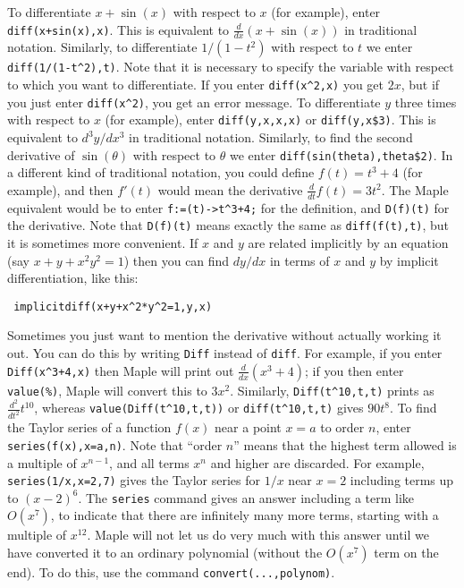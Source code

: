 \documentclass{amsart}
\begin{document}
\begin{itemize}
%
  To differentiate $x+\sin(x)$ with respect to $x$ (for
  example), enter \verb~diff(x+sin(x),x)~.  This is
  equivalent to $\frac{d}{dx}(x+\sin(x))$ in traditional
  notation.  Similarly, to differentiate $1/(1-t^2)$ with
  respect to $t$ we enter \verb~diff(1/(1-t^2),t)~.  
%
  Note that it is necessary to specify the
  variable with respect to which you want to differentiate. 
  If you enter \verb~diff(x^2,x)~ you get $2x$, but if you
  just enter \verb~diff(x^2)~, you get an error message. 
%
  To differentiate $y$ three times with respect to $x$
  (for example), enter \verb~diff(y,x,x,x)~ or
  \verb~diff(y,x$3)~.  This is equivalent to $d^3y/dx^3$ in
  traditional notation.  Similarly, to find the second
  derivative of $\sin(\theta)$ with respect to $\theta$ we
  enter \verb~diff(sin(theta),theta$2)~. 
%
  In a different kind of traditional notation, you
  could define $f(t)=t^3+4$ (for example), and then $f'(t)$
  would mean the derivative $\frac{d}{dt}f(t)=3t^2$.  The
  Maple equivalent would be to enter \verb~f:=(t)->t^3+4;~
  for the definition, and \verb~D(f)(t)~ for the derivative. 
  Note that \verb~D(f)(t)~ means exactly the same as
  \verb~diff(f(t),t)~, but it is sometimes more convenient. 
%
  If $x$ and $y$ are related implicitly
  by an equation (say $x+y+x^2y^2=1$) then you can find
  $dy/dx$ in terms of $x$ and $y$ by implicit
  differentiation, like this: 
\begin{verbatim}
 implicitdiff(x+y+x^2*y^2=1,y,x)
\end{verbatim}
%
  Sometimes you just want to mention the derivative
  without actually working it out.  You can do this by
  writing \verb~Diff~ instead of \verb~diff~.  For example,
  if you enter \verb~Diff(x^3+4,x)~ then Maple will print
  out $\frac{d}{dx}(x^3+4)$; if you then enter
  \verb~value(%)~, Maple will convert this to $3x^2$. 
  Similarly, \verb~Diff(t^10,t,t)~ prints as
  $\frac{d^2}{dt^2}t^{10}$, whereas
  \verb~value(Diff(t^10,t,t))~ or \verb~diff(t^10,t,t)~
  gives $90 t^8$. 
%
  To find the Taylor series of a function $f(x)$ near a
  point $x=a$ to order $n$, enter
  \verb~series(f(x),x=a,n)~.  Note that ``order $n$'' means
  that the highest term allowed is a multiple of $x^{n-1}$,
  and all terms $x^n$ and higher are discarded.  For
  example, \verb~series(1/x,x=2,7)~ gives the Taylor series
  for $1/x$ near $x=2$ including terms up to $(x-2)^6$. 
%
  The \verb~series~ command gives an answer including a term
  like $O(x^7)$,  to indicate that there are
   infinitely many more terms, starting with a multiple of
   $x^{12}$.  Maple will not let us do very much with this
   answer until we have converted it to an ordinary
   polynomial (without the $O(x^7)$ term on the end).  To do
   this, use the command \verb~convert(...,polynom)~. 
\end{itemize}
\end{document}
